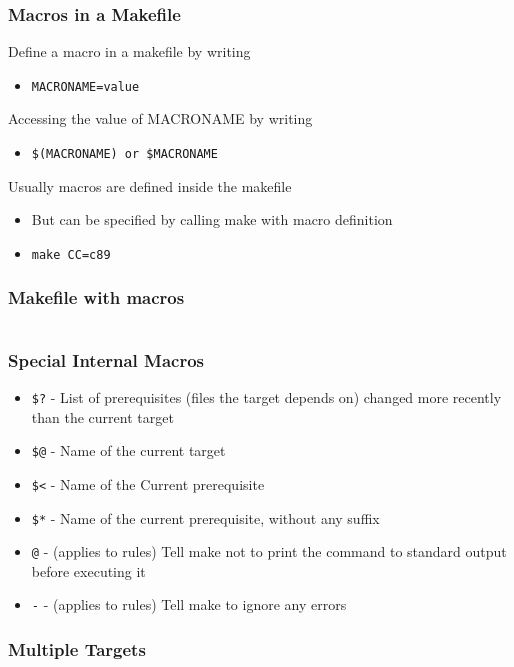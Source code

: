 \documentclass[newPxFont,sthlmFooter,nooffset]{beamer}
\begin{document}
\begin{frame}[t]
  \frametitle{Macros in a Makefile}
Define a macro in a makefile by writing 
\begin{itemize}
\item \texttt{MACRONAME=value}
\end{itemize}


Accessing the value of MACRONAME by writing 
\begin{itemize}
\item \texttt{\$(MACRONAME) or \${MACRONAME}}
\end{itemize}


Usually macros are defined inside the makefile
\begin{itemize}
\item But can be specified by calling make with macro definition
\item \texttt{make CC=c89}
\end{itemize}


\end{frame}

\begin{frame}
  \frametitle{Makefile with macros}
  \begin{columns}
    \begin{column}{0.5\textwidth}
      
    \end{column}
    \begin{column}{0.45\textwidth}
      
    \end{column}
  \end{columns}

\end{frame}

\begin{frame}[t]
  \frametitle{Special Internal Macros}
  \begin{itemize}
  \item \texttt{\$?} - List of prerequisites (files the target depends
    on) changed more recently than the current target
  \item \texttt{\$@} - Name of the current target
  \item \texttt{\$<} - Name of the Current prerequisite
  \item \texttt{\$*} - Name of the current prerequisite, without any suffix
  \item \texttt{@} - (applies to rules) Tell make not to print the command to standard output before executing it
  \item \texttt{-} - (applies to rules) Tell make to ignore any errors

  \end{itemize}
\end{frame}

\begin{frame}[t]
  \frametitle{Multiple Targets}
  
\end{frame}
\end{document}
